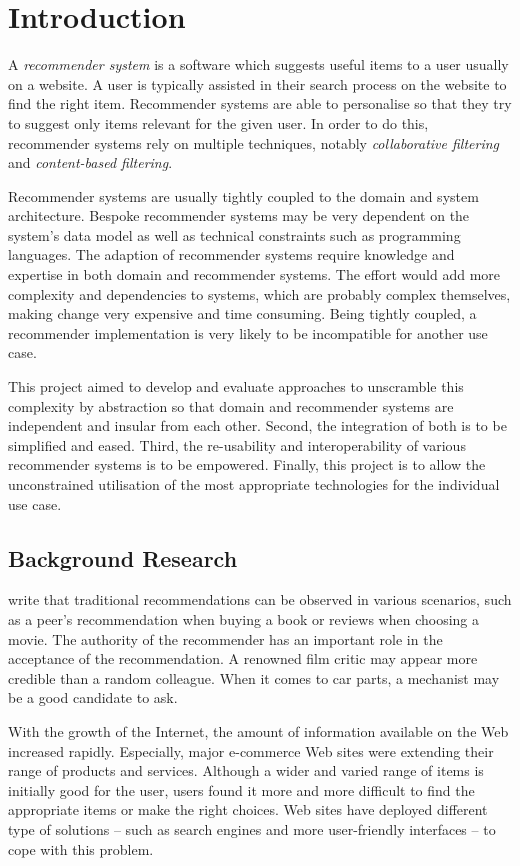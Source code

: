 \chapter{Introduction}

A \emph{recommender system} is a software which suggests useful items to a user usually on a website. A user is typically assisted in their search process on the website to find the right item. Recommender systems are able to personalise so that they try to suggest only items relevant for the given user. In order to do this, recommender systems rely on multiple techniques, notably \emph{collaborative filtering} and \emph{content-based filtering}.

Recommender systems are usually tightly coupled to the domain and system architecture. Bespoke recommender systems may be very dependent on the system's data model as well as technical constraints such as programming languages. The adaption of recommender systems require knowledge and expertise in both domain and recommender systems. The effort would add more complexity and dependencies to systems, which are probably complex themselves, making change very expensive and time consuming. Being tightly coupled, a recommender implementation is very likely to be incompatible for another use case.

This project aimed to develop and evaluate approaches to unscramble this complexity by abstraction so that domain and recommender systems are independent and insular from each other. Second, the integration of both is to be simplified and eased. Third, the re-usability and interoperability of various recommender systems is to be empowered. Finally, this project is to allow the unconstrained utilisation of the most appropriate technologies for the individual use case.

\section{Background Research}

\citet{ricci11} write that traditional recommendations can be observed in various scenarios, such as a peer's recommendation when buying a book or reviews when choosing a movie. The authority of the recommender has an important role in the acceptance of the recommendation. A renowned film critic may appear more credible than a random colleague. When it comes to car parts, a mechanist may be a good candidate to ask.

With the growth of the Internet, the amount of information available on the Web increased rapidly. Especially, major e-commerce Web sites were extending their range of products and services. Although a wider and varied range of items is initially good for the user, users found it more and more difficult to find the appropriate items or make the right choices. Web sites have deployed different type of solutions -- such as search engines and more user-friendly interfaces -- to cope with this problem.

